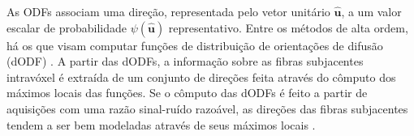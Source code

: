 \documentclass[
    12pt,                %
    oneside,            %
    a4paper,            %
    english,            %
    french,                %
    spanish,            %
    brazil                %
    ]{abntex2}
\begin{document}


%



As ODFs associam uma direção, representada pelo vetor unitário $\mathbf{\hat{u}}$, a um valor escalar de probabilidade $\psi(\mathbf{\hat{u}})$ representativo. Entre os métodos de alta ordem, há os que visam computar funções de distribuição de orientações de difusão (dODF) \cite{TuchQBall2004, wedeen2005, yeh2010}. A partir das dODFs, a informação sobre as fibras subjacentes intravóxel é extraída de um conjunto de direções feita através do cômputo dos máximos locais das funções. Se o cômputo das dODFs é feito a partir de aquisições com uma razão sinal-ruído razoável, as direções das fibras subjacentes tendem a ser bem modeladas através de seus máximos locais \cite{fillard2011}.
\end{document}
